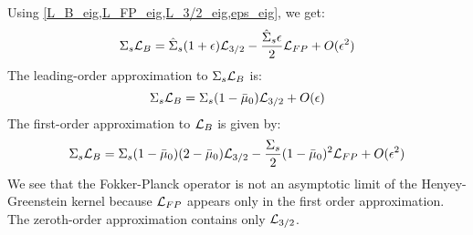 Using \cref{L_B_eig,L_FP_eig,L_3/2_eig,eps_eig}, we get:
\begin{equation}
\Sigma_s\mc{L}_B = \hat{\Sigma}_s(1+\epsilon) \mc{L}_{3/2} -
\frac{\hat{\Sigma}_s \epsilon}{2} \mc{L}_{FP} + O(\epsilon^2)
\label{HG_approx}
\end{equation}
The leading-order approximation to $\Sigma_s \mathcal{L}_B$ is:
\begin{equation}
\Sigma_s \mathcal{L}_B = \Sigma_s(1-\bar{\mu}_0) \mathcal{L}_{3/2} +O(\epsilon)
\end{equation}
The first-order approximation to $\mathcal{L}_B$ is given by:
\begin{equation}
\Sigma_s\mathcal{L}_B = \Sigma_s(1-\bar{\mu}_0)(2-\bar{\mu}_0) \mathcal{L}_{3/2} -
\frac{\Sigma_s}{2}(1-\bar{\mu}_0)^2\mathcal{L}_{FP} + O(\epsilon^2)
\end{equation}
We see that the Fokker-Planck operator is not an asymptotic limit of the
Henyey-Greenstein kernel because $\mathcal{L}_{FP}$ appears only in the first order
approximation. The zeroth-order approximation contains only $\mathcal{L}_{3/2}$.

